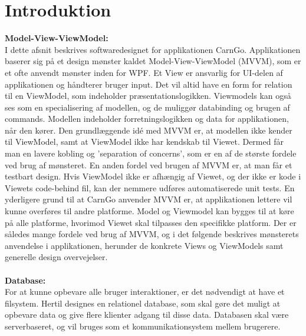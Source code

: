 \documentclass[a4paper,12pt,fleqn,oneside]{article}
\begin{document}
\section{Introduktion}
\textbf{Model-View-ViewModel:}\\
I dette afsnit beskrives softwaredesignet for applikationen CarnGo. Applikationen baserer sig på et design mønster kaldet Model-View-ViewModel (MVVM), som er et ofte anvendt mønster inden for WPF. Et View er ansvarlig for UI-delen af applikationen og håndterer bruger input. Det vil altid have en form for relation til en ViewModel, som indeholder præsentationslogikken. Viewmodels kan også ses som en specialisering af modellen, og de muliggør databinding og brugen af commands. Modellen indeholder forretningslogikken og data for applikationen, når den kører. Den grundlæggende idé med MVVM er, at modellen ikke kender til ViewModel, samt at ViewModel ikke har kendskab til Viewet. Dermed får man en lavere kobling og 'separation of concerns', som er en af de største fordele ved brug af mønsteret. En anden fordel ved brugen af MVVM er, at man får et testbart design. Hvis ViewModel ikke er afhængig af Viewet, og der ikke er kode i Viewets code-behind fil, kan der nemmere udføres automatiserede unit tests. En yderligere grund til at CarnGo anvender MVVM er, at applikationen lettere vil kunne overføres til andre platforme. Model og Viewmodel kan bygges til at køre på alle platforme, hvorimod Viewet skal tilpasses den specifikke platform. Der er således mange fordele ved brug af MVVM, og i det følgende beskrives mønsterets anvendelse i applikationen, herunder de konkrete Views og ViewModels samt generelle design overvejelser.\\\\
\textbf{Database:}\\
For at kunne opbevare alle bruger interaktioner, er det nødvendigt at have et filsystem. Hertil designes en relationel database, som skal gøre det muligt at opbevare data og give flere klienter adgang til disse data. Databasen skal være serverbaseret, og vil bruges som et kommunikationsystem mellem brugerere. 
\end{document}
